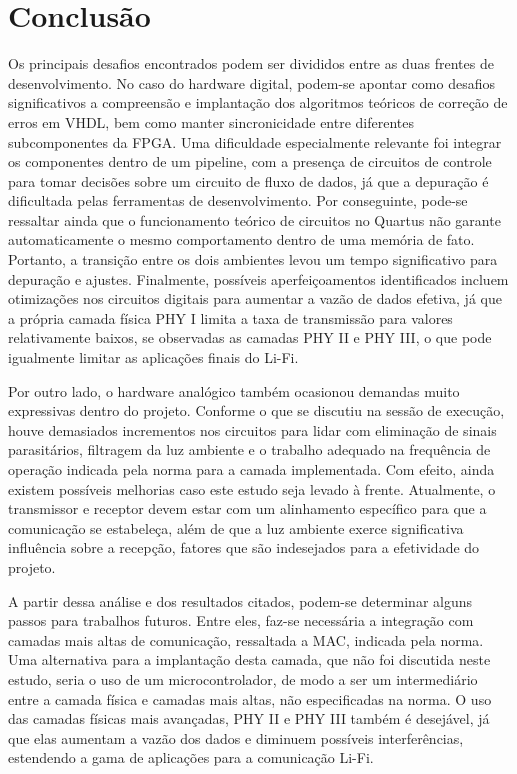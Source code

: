 	\chapter{Conclusão}\label{cap-conclusao}
		
	Os principais desafios encontrados podem ser divididos entre as duas frentes de desenvolvimento. No caso do hardware digital, podem-se apontar como desafios significativos a compreensão e implantação dos algoritmos teóricos de correção de erros em VHDL, bem como manter sincronicidade entre diferentes subcomponentes da FPGA. Uma dificuldade especialmente relevante foi integrar os componentes dentro de um pipeline, com a presença de circuitos de controle para tomar decisões sobre um circuito de fluxo de dados, já que a depuração é dificultada pelas ferramentas de desenvolvimento. Por conseguinte, pode-se ressaltar ainda que o funcionamento teórico de circuitos no Quartus não garante automaticamente o mesmo comportamento dentro de uma memória de fato. Portanto, a transição entre os dois ambientes levou um tempo significativo para depuração e ajustes. Finalmente, possíveis aperfeiçoamentos identificados incluem otimizações nos circuitos digitais para aumentar a vazão de dados efetiva, já que a própria camada física PHY I limita a taxa de transmissão para valores relativamente baixos, se observadas as camadas PHY II e PHY III, o que pode igualmente limitar as aplicações finais do Li-Fi.
	
	Por outro lado, o hardware analógico também ocasionou demandas muito expressivas dentro do projeto. Conforme o que se discutiu na sessão de execução, houve demasiados incrementos nos circuitos para lidar com eliminação de sinais parasitários, filtragem da luz ambiente e o trabalho adequado na frequência de operação indicada pela norma para a camada implementada. Com efeito, ainda existem possíveis melhorias caso este estudo seja levado à frente. Atualmente, o transmissor e receptor devem estar com um alinhamento específico para que a comunicação se estabeleça, além de que a luz ambiente exerce significativa influência sobre a recepção, fatores que são indesejados para a efetividade do projeto.
	
	A partir dessa análise e dos resultados citados, podem-se determinar alguns passos para trabalhos futuros. Entre eles, faz-se necessária a integração com camadas mais altas de comunicação, ressaltada a MAC, indicada pela norma. Uma alternativa para a implantação desta camada, que não foi discutida neste estudo, seria o uso de um microcontrolador, de modo a ser um intermediário entre a camada física e camadas mais altas, não especificadas na norma. O uso das camadas físicas mais avançadas, PHY II e PHY III também é desejável, já que elas aumentam a vazão dos dados e diminuem possíveis interferências, estendendo a gama de aplicações para a comunicação Li-Fi.
	
